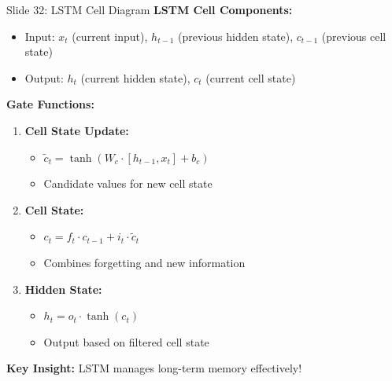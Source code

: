 \documentclass[8pt]{beamer}
\begin{document}
	\begin{frame}{Slide 32: LSTM Cell Diagram}
		\fontsize{6.5}{7.5}\selectfont
		\textbf{LSTM Cell Components:}
		\begin{itemize}
			\item Input: $x_t$ (current input), $h_{t-1}$ (previous hidden state), $c_{t-1}$ (previous cell state)
			\item Output: $h_t$ (current hidden state), $c_t$ (current cell state)
		\end{itemize}
		
		\vspace{0.1cm}
		\textbf{Gate Functions:}
		\begin{enumerate}
			\item \textbf{Cell State Update:}
			\begin{itemize}
				\item $\tilde{c}_t = \tanh(W_c \cdot [h_{t-1}, x_t] + b_c)$
				\item Candidate values for new cell state
			\end{itemize}
			\item \textbf{Cell State:}
			\begin{itemize}
				\item $c_t = f_t \cdot c_{t-1} + i_t \cdot \tilde{c}_t$
				\item Combines forgetting and new information
			\end{itemize}
			\item \textbf{Hidden State:}
			\begin{itemize}
				\item $h_t = o_t \cdot \tanh(c_t)$
				\item Output based on filtered cell state
			\end{itemize}
		\end{enumerate}
		
		\textcolor{myblue}{\textbf{Key Insight:}} LSTM manages long-term memory effectively!
	\end{frame}
	
\end{document}
